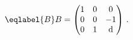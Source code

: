 \begin{equation}
\eqlabel{B} B =\begin{pmatrix} 1 & 0 & 0 \\ 0 & 0 & -1 \\ 0 & 1 &
$d$
\end{pmatrix}\,.
\end{equation}

